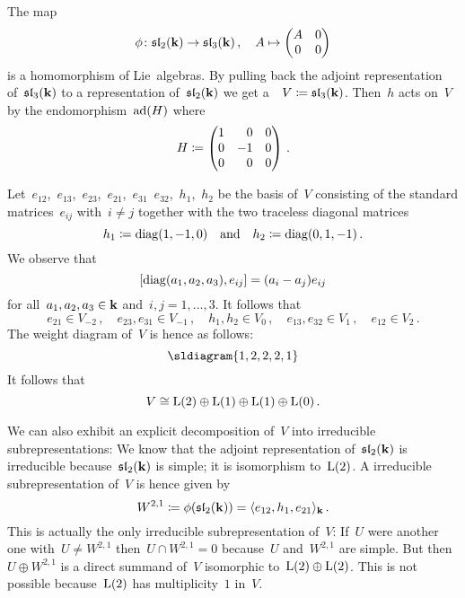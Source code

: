 \begin{example}
  The map
  \[
    \phi
    \colon
    \mathfrak{sl}_2(\mathbf{k})
    \to
    \mathfrak{sl}_3(\mathbf{k}) \,,
    \quad
    A
    \mapsto
    \begin{pmatrix}
      A & 0 \\
      0 & 0
    \end{pmatrix}
  \]
  is a homomorphism of Lie~algebras.
  By pulling back the adjoint representation of~$\mathfrak{sl}_3(\mathbf{k})$ to a representation of~$\mathfrak{sl}_2(\mathbf{k})$ we get a~{}~$V \coloneqq \mathfrak{sl}_3(\mathbf{k})$.
  Then~$h$ acts on~$V$ by the endomorphism~$\operatorname{ad}(H)$ where
  \[
    H
    \defined
    \begin{pmatrix*}[r]
    1 &  0 & 0 \\
    0 & -1 & 0 \\
    0 &  0 & 0
    \end{pmatrix*} \,.
  \]

  Let~$e_{12}$,~$e_{13}$,~$e_{23}$,~$e_{21}$,~$e_{31}$~$e_{32}$,~$h_1$,~$h_2$ be the basis of~$V$ consisting of the standard matrices~$e_{ij}$ with~$i \neq j$ together with the two traceless diagonal matrices
  \[
    h_1
    \coloneqq
    \operatorname{diag}(1,-1,0)
    \quad\text{and}\quad
    h_2
    \coloneqq
    \operatorname{diag}(0,1,-1) \,.
  \]
  We observe that
  \[
    [\operatorname{diag}(a_1, a_2, a_3), e_{ij}] = (a_i - a_j) e_{ij}
  \]
  for all~$a_1, a_2, a_3 \in \mathbf{k}$ and~$i,j = 1, \dotsc, 3$.
  It follows that
  \[
    e_{21}
    \in
    V_{-2}\,,
    \quad
    e_{23}, e_{31}
    \in
    V_{-1}  \,,
    \quad
    h_1, h_2
    \in
    V_0 \,,
    \quad
    e_{13}, e_{32}
    \in
    V_1 \,,
    \quad
    e_{12}
    \in
    V_2 \,.
  \]
  The weight diagram of~$V$ is hence as follows:
  \[
    \sldiagram{1,2,2,2,1}
  \]
  It follows that
  \[
    V
    \cong
    \operatorname{L}(2) \oplus \operatorname{L}(1) \oplus \operatorname{L}(1) \oplus \operatorname{L}(0)  \,.
  \]
  
  We can also exhibit an explicit decomposition of~$V$ into irreducible subrepresentations:
  We know that the adjoint representation of~$\mathfrak{sl}_2(\mathbf{k})$ is irreducible because~$\mathfrak{sl}_2(\mathbf{k})$ is simple;
  it is isomorphism to~$\operatorname{L}(2)$.
  A {\threedimensional} irreducible subrepresentation of~$V$ is hence given by
  \[
    W^{2,1}
    \coloneqq
    \phi(\mathfrak{sl}_2(\mathbf{k}))
    =
    \langle e_{12}, h_1, e_{21} \rangle_{\mathbf{k}} \,.
  \]
  This is actually the only {\threedimensional} irreducible subrepresentation of~$V$:
  If~$U$ were another one with~$U \neq W^{2,1}$ then~$U \cap W^{2,1} = 0$ because~$U$ and~$W^{2,1}$ are simple.
  But then~$U \oplus W^{2,1}$ is a direct summand of~$V$ isomorphic to~$\operatorname{L}(2) \oplus \operatorname{L}(2)$.
  This is not possible because~$\operatorname{L}(2)$ has multiplicity~$1$ in~$V$.
  

\end{example}
